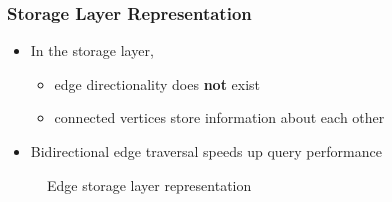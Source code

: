 \begin{frame}
  \frametitle{Storage Layer Representation}
  \begin{itemize}
  \item In the storage layer,
    \begin{itemize}
    \item edge directionality does \textbf{not} exist
    \item connected vertices store information about each other
    \end{itemize}
  \item Bidirectional edge traversal speeds up query performance
  \end{itemize}
  \begin{figure}
    \centering
    
    \caption{Edge storage layer representation}
  \end{figure}
\end{frame}